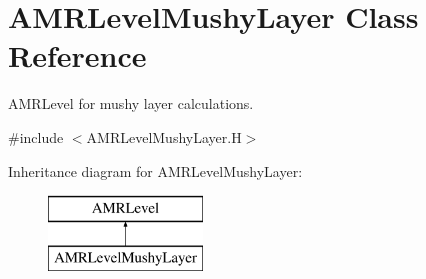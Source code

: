 \hypertarget{class_a_m_r_level_mushy_layer}{\section{A\-M\-R\-Level\-Mushy\-Layer Class Reference}
\label{class_a_m_r_level_mushy_layer}
}


A\-M\-R\-Level for mushy layer calculations.  




{\ttfamily \#include $<$A\-M\-R\-Level\-Mushy\-Layer.\-H$>$}

Inheritance diagram for A\-M\-R\-Level\-Mushy\-Layer\-:\begin{figure}[H]
\begin{center}
\leavevmode
\includegraphics[height=2.000000cm]{class_a_m_r_level_mushy_layer}
\end{center}
\end{figure}
